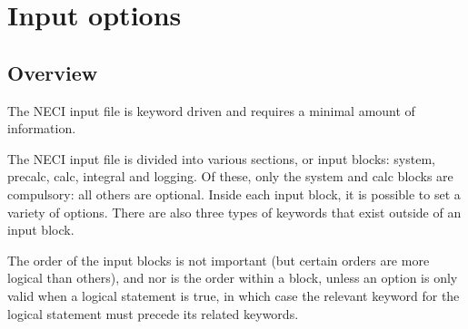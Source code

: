 \documentclass[openany,a4paper,10pt,english]{manual}
\begin{document}
\resetcurrentobjects
\hypertarget{--doc-input/index}{}

\hypertarget{input-index}{}\chapter{Input options}

\resetcurrentobjects
\hypertarget{--doc-input/overview}{}

\hypertarget{input-overview}{}\section{Overview}

The NECI input file is keyword driven and requires a minimal amount of information.

The NECI input file is divided into various sections, or input blocks: system, precalc, calc, integral and logging.  Of these, only the system and calc blocks are compulsory: all others are optional.  Inside each input block, it is possible to set a variety of options.  There are also three types of keywords that exist outside of an input block.

The order of the input blocks is not important (but certain orders are more logical than others), and nor is the order within a block, unless an option is only valid when a logical statement is true, in which case the relevant keyword for the logical statement must precede its related keywords.
\end{document}
